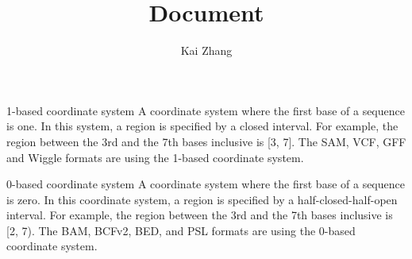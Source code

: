 \documentclass[12pt]{scrartcl}
\title{Document}
\author{Kai Zhang}
\date{}
\begin{document}
\maketitle

\tableofcontents
\newpage

1-based coordinate system A coordinate system where the first base of a sequence
is one. In this system, a region is specified by a closed interval. For example, the
region between the 3rd and the 7th bases inclusive is [3, 7]. The SAM, VCF, GFF and Wiggle
formats are using the 1-based coordinate system.

0-based coordinate system A coordinate system where the first base of a sequence
is zero. In this coordinate system, a region is specified by a half-closed-half-open interval.
For example, the region between the 3rd and the 7th bases inclusive is [2, 7).
The BAM, BCFv2, BED, and PSL formats are using the 0-based coordinate system.

\printbibliography
\end{document}
